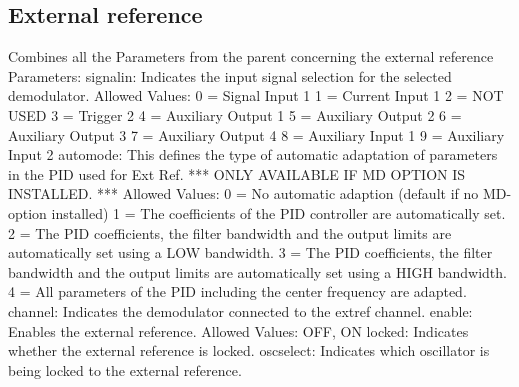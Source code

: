 \documentclass[11pt]{article} %
\begin{document}
\subsection{External reference}
    Combines all the Parameters from the parent concerning the external reference
    Parameters:
            signalin: Indicates the input signal selection for the selected
                demodulator.
                Allowed Values:
                    0 = Signal Input 1
                    1 = Current Input 1
                    2 = NOT USED
                    3 = Trigger 2
                    4 = Auxiliary Output 1
                    5 = Auxiliary Output 2
                    6 = Auxiliary Output 3
                    7 = Auxiliary Output 4
                    8 = Auxiliary Input 1
                    9 = Auxiliary Input 2
            automode: This defines the type of automatic adaptation of parameters
                in the PID used for Ext Ref.
                *** ONLY AVAILABLE IF MD OPTION IS INSTALLED. ***
                Allowed Values:
                    0 = No automatic adaption (default if no MD-option installed)
                    1 = The coefficients of the PID controller are automatically set.
                    2 = The PID coefficients, the filter bandwidth and the output
                        limits are automatically set using a LOW bandwidth.
                    3 = The PID coefficients, the filter bandwidth and the output
                        limits are automatically set using a HIGH bandwidth.
                    4 = All parameters of the PID including the center frequency
                        are adapted.
            channel: Indicates the demodulator connected to the extref channel.
            enable: Enables the external reference.
                Allowed Values:
                    OFF, ON
            locked: Indicates whether the external reference is locked.
            oscselect: Indicates which oscillator is being locked to the external
                reference.
\end{document}
